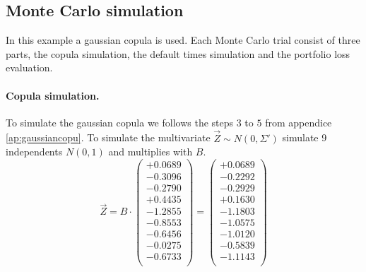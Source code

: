 \documentclass[a4paper,12pt,final]{article}
\begin{document}
\subsection{Monte Carlo simulation}

In this example a gaussian copula is used. Each Monte Carlo trial consist of 
three parts, the copula simulation, the default times simulation and the
portfolio loss evaluation.

\paragraph{Copula simulation.} To simulate the gaussian copula we follows the 
steps $3$ to $5$ from appendice \ref{ap:gaussiancopu}. To simulate the multivariate
$\vec{Z} \sim N(0,\Sigma')$ simulate 9 independents $N(0,1)$ and multiplies 
with $B$.
{\small
\begin{displaymath}
\vec{Z} = B \cdot
\left(
\begin{array}{c}
  +0.0689 \\
  -0.3096 \\
  -0.2790 \\
  +0.4435 \\
  -1.2855 \\
  -0.8553 \\
  -0.6456 \\
  -0.0275 \\
  -0.6733 \\
\end{array}
\right) 
=
\left(
\begin{array}{c}
  +0.0689 \\
  -0.2292 \\
  -0.2929 \\
  +0.1630 \\
  -1.1803 \\
  -1.0575 \\
  -1.0120 \\
  -0.5839 \\
  -1.1143 \\
\end{array}
\right) 
\end{displaymath}
}
\end{document}
